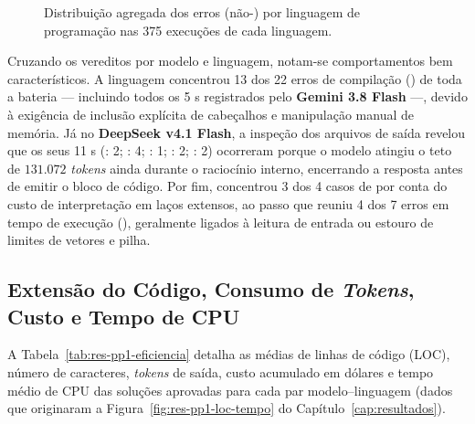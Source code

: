 \begin{figure}[!htbp]
\centering

\caption[Distribuição agregada de erros por linguagem na PP1]{Distribuição agregada dos erros (não-) por linguagem de programação nas 375 execuções de cada linguagem.}
\label{fig:res-pp1-erros-linguagem}
\end{figure}
\FloatBarrier

Cruzando os vereditos por modelo e linguagem, notam-se comportamentos bem característicos. A linguagem  concentrou 13 dos 22 erros de compilação () de toda a bateria --- incluindo todos os 5 s registrados pelo \textbf{Gemini 3.8 Flash} ---, devido à exigência de inclusão explícita de cabeçalhos e manipulação manual de memória. Já no \textbf{DeepSeek v4.1 Flash}, a inspeção dos arquivos de saída revelou que os seus 11 s (: 2; : 4; : 1; : 2; : 2) ocorreram porque o modelo atingiu o teto de $131.072$ \textit{tokens} ainda durante o raciocínio interno, encerrando a resposta antes de emitir o bloco de código. Por fim,  concentrou 3 dos 4 casos de  por conta do custo de interpretação em laços extensos, ao passo que  reuniu 4 dos 7 erros em tempo de execução (), geralmente ligados à leitura de entrada ou estouro de limites de vetores e pilha.

\subsection{Extensão do Código, Consumo de \textit{Tokens}, Custo e Tempo de CPU}\label{sec:res-rq1-eficiencia}

A Tabela~\ref{tab:res-pp1-eficiencia} detalha as médias de linhas de código (LOC), número de caracteres, \textit{tokens} de saída, custo acumulado em dólares e tempo médio de CPU das soluções aprovadas para cada par modelo--linguagem (dados que originaram a Figura~\ref{fig:res-pp1-loc-tempo} do Capítulo~\ref{cap:resultados}).

